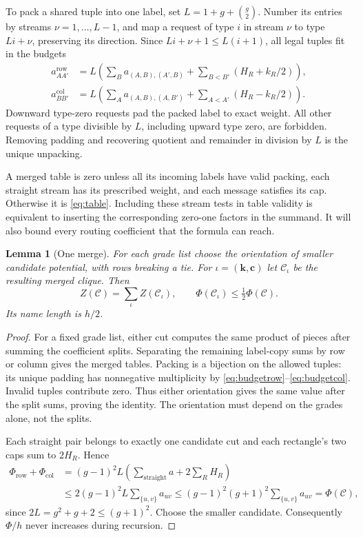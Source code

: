 \documentclass[11pt]{article}
\newtheorem{lemma}[theorem]{Lemma}
\theoremstyle{definition}
\theoremstyle{remark}
\newcommand{\row}{\mathrm{row}}
\newcommand{\col}{\mathrm{col}}
\begin{document}
To pack a shared tuple into one label, set $L=1+g+\binom g2$. Number its entries by streams $\nu=1,\ldots,L-1$, and map a request of type $i$ in stream $\nu$ to type $Li+\nu$, preserving its direction. Since $Li+\nu+1\le L(i+1)$, all legal tuples fit in the budgets
\begin{align}
 a^\row_{AA'}&=L\left(\sum_B a_{(A,B),(A',B)}
               +\sum_{B<B'}(H_R+k_R/2)\right),\label{eq:budgetrow}\\
 a^\col_{BB'}&=L\left(\sum_A a_{(A,B),(A,B')}
               +\sum_{A<A'}(H_R-k_R/2)\right).\label{eq:budgetcol}
\end{align}
Downward type-zero requests pad the packed label to exact weight. All other requests of a type divisible by $L$, including upward type zero, are forbidden. Removing padding and recovering quotient and remainder in division by $L$ is the unique unpacking.

A merged table is zero unless all its incoming labels have valid packing, each straight stream has its prescribed weight, and each message satisfies its cap. Otherwise it is \eqref{eq:table}. Including these stream tests in table validity is equivalent to inserting the corresponding zero-one factors in the summand. It will also bound every routing coefficient that the formula can reach.

\begin{lemma}[One merge]\label{lem:merge}
For each grade list choose the orientation of smaller candidate potential, with rows breaking a tie. For $\iota=(\mathbf k,\mathbf c)$ let $\mathcal C_\iota$ be the resulting merged clique. Then
\[
 Z(\mathcal C)=\sum_\iota Z(\mathcal C_\iota),\qquad
 \Phi(\mathcal C_\iota)\le\tfrac12\Phi(\mathcal C).
\]
Its name length is $h/2$.
\end{lemma}

\begin{proof}
For a fixed grade list, either cut computes the same product of pieces after summing the coefficient splits. Separating the remaining label-copy sums by row or column gives the merged tables. Packing is a bijection on the allowed tuples: its unique padding has nonnegative multiplicity by \eqref{eq:budgetrow}--\eqref{eq:budgetcol}. Invalid tuples contribute zero. Thus either orientation gives the same value after the split sums, proving the identity. The orientation must depend on the grades alone, not the splits.

Each straight pair belongs to exactly one candidate cut and each rectangle's two caps sum to $2H_R$. Hence
\begin{align*}
 \Phi_\row+\Phi_\col
 &=(g-1)^2L\left(\sum_{\text{straight}}a+2\sum_RH_R\right)\\
 &\le2(g-1)^2L\sum_{\{u,v\}}a_{uv}
 \le(g-1)^2(g+1)^2\sum_{\{u,v\}}a_{uv}=\Phi(\mathcal C),
\end{align*}
since $2L=g^2+g+2\le(g+1)^2$. Choose the smaller candidate. Consequently $\Phi/h$ never increases during recursion.
\end{proof}
\end{document}
